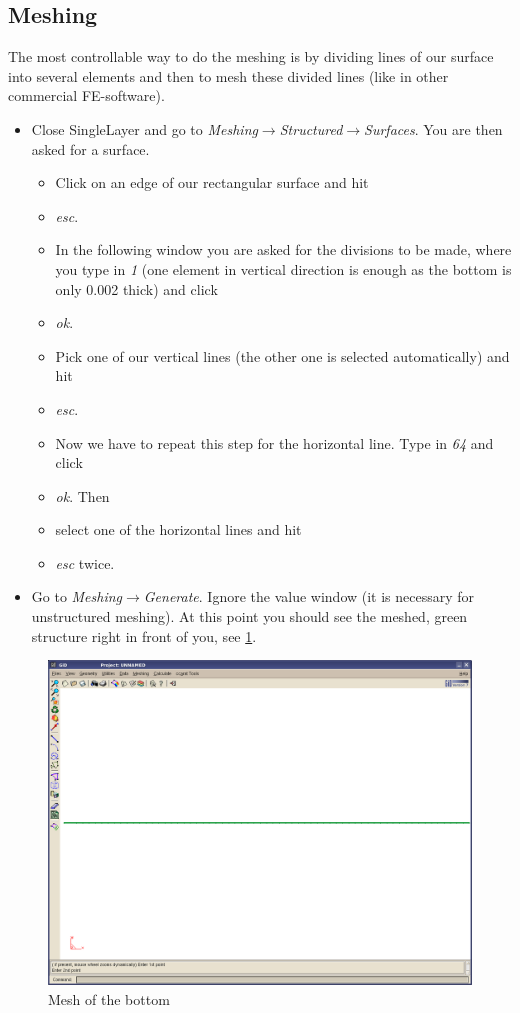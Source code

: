 \subsection{Meshing}

The most controllable way to do the meshing is by dividing lines of
our surface into several elements and then to mesh these divided lines
(like in other commercial FE-software).

\begin{itemize}
\item Close SingleLayer and go to \emph{Meshing$\to$Structured$\to$Surfaces}.
You are then asked for a surface. 

\begin{itemize}
\item Click on an edge of our rectangular surface and hit 
\item \emph{esc}.
\item In the following window you are asked for the divisions to be made,
where you type in \emph{1} (one element in vertical direction is enough
as the bottom is only 0.002 thick) and click 
\item \emph{ok}. 
\item Pick one of our vertical lines (the other one is selected automatically)
and hit 
\item \emph{esc}.
\item Now we have to repeat this step for the horizontal line. Type in \emph{64}
and click 
\item \emph{ok}. Then 
\item select one of the horizontal lines and hit 
\item \emph{esc} twice. 
\end{itemize}
\item Go to \emph{Meshing$\to$Generate}. Ignore the value window (it is
necessary for unstructured meshing). At this point you should see
the meshed, green structure right in front of you, see \ref{tut_fsi:3.2}.
\end{itemize}
%
\begin{figure}[h]
\includegraphics[width=1\columnwidth]{Bilder/structure_02}


\caption{\label{tut_fsi:3.2} Mesh of the bottom}
\end{figure}


